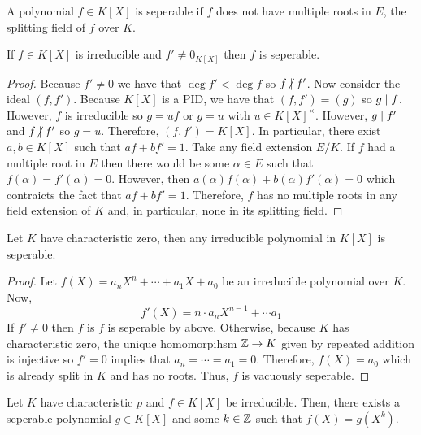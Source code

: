 \documentclass[12pt]{extarticle}
\begin{document}
\begin{definition}
A polynomial $f \in K[X]$ is seperable if $f$ does not have multiple roots in $E$, the splitting field of $f$ over $K$. 
\end{definition}

\begin{lemma}
If $f \in K[X]$ is irreducible and $f' \neq 0_{K[X]}$ then $f$ is seperable.
\end{lemma}

\begin{proof}
Because $f' \neq 0$ we have that $\deg{f'} < \deg{f}$ so $f \ndivides f'$. Now consider the ideal $(f, f')$. Because $K[X]$ is a PID, we have that $(f, f') = (g)$ so $g \mid f$. However, $f$ is irreducible so $g = uf$ or $g = u$ with $u \in K[X]^\times$. However, $g \mid f'$ and $f \ndivides f'$ so $g = u$. Therefore, $(f, f') = K[X]$. In particular, there exist $a, b \in K[X]$ such that $af + bf' = 1$. Take any field extension $E/K$. If $f$ had a multiple root in $E$ then there would be some $\alpha \in E$ such that $f(\alpha) = f'(\alpha) = 0$. However, then $a(\alpha) f(\alpha) + b(\alpha) f'(\alpha) = 0$ which contraicts the fact that $a f + b f' = 1$. Therefore, $f$ has no multiple roots in any field extension of $K$ and, in particular, none in its splitting field.  
\end{proof} 

\begin{proposition}
Let $K$ have characteristic zero, then any irreducible polynomial in $K[X]$ is seperable. 
\end{proposition}

\begin{proof}
Let $f(X) = a_n X^n + \cdots + a_1 X + a_0$ be an irreducible polynomial over $K$. Now, \[f'(X) = n \cdot a_n X^{n-1} + \cdots a_1\] If $f' \neq 0$ then $f$ is $f$ is seperable by above. Otherwise, because $K$ has characteristic zero, the unique homomorpihsm $\mathbb{Z} \to K$ given by repeated addition is injective so $f' = 0$ implies that $a_n = \cdots= a_1 = 0$. Therefore, $f(X) = a_0$ which is already split in $K$ and has no roots. Thus, $f$ is vacuously seperable.   
\end{proof}

\begin{lemma}
Let $K$ have characteristic $p$ and $f \in K[X]$ be irreducible. Then, there exists a seperable polynomial $g \in K[X]$ and some $k \in \mathbb{Z}$ such that $f(X) = g(X^k)$. 
\end{lemma}
\end{document}

